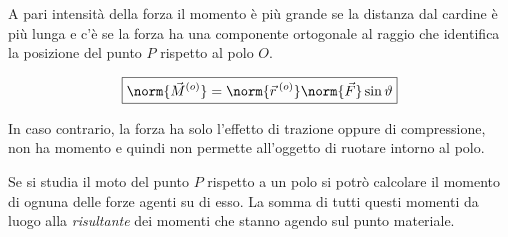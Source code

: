 \FloatBarrier
A pari intensità della forza il momento è più grande se la distanza dal cardine è più lunga e c'è se la forza ha una componente ortogonale al raggio che identifica la posizione del punto $P$ rispetto al polo $O$.

\[
	\boxed{\norm{\vec{M}^{(o)}}= \norm{\vec{r}\,^{(o)}} \norm{\vec{F}} \sin\vartheta}
\]

In caso contrario, la forza ha solo l'effetto di trazione oppure di compressione, non ha momento e quindi non permette all'oggetto di ruotare intorno al polo.

Se si studia il moto del punto $P$ rispetto a un polo si potrò calcolare il momento di ognuna delle forze agenti su di esso. La somma di tutti questi momenti da luogo alla \emph{risultante} dei momenti che stanno agendo sul punto materiale.

